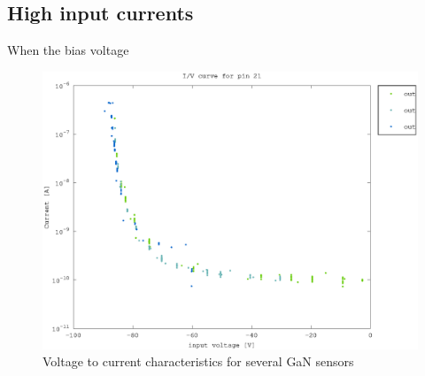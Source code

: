\subsection{High input currents}
When the bias voltage



\begin{figure}[h]
	    \centering
	    \includegraphics[width=\textwidth]{fig/pin21_slope.eps}
	    \caption[]%
	    {Voltage to current characteristics for several GaN sensors}    
	    \label{fig:pin21_slope}	
\end{figure}  

